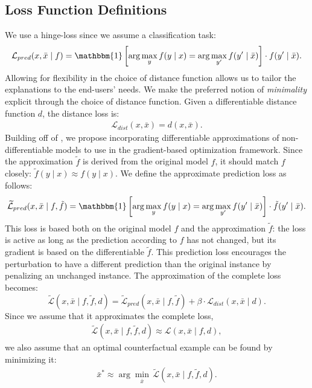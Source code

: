 \subsection{Loss Function Definitions}

We use a hinge-loss since we assume a classification task:
%
\begin{align}
\mathcal{L}_{pred}(x, \bar{x} \mid f) = {\mathbbm{1}}\left[\arg\max_{y} f(y \mid x) = \arg\max_{y'} f(y' \mid \bar{x})\right] \cdot  f(y' \mid \bar{x}).
\end{align}
%
Allowing for flexibility in the choice of distance function allows us to tailor the explanations to the end-users' needs. We make the preferred notion of \emph{minimality} explicit through the choice of distance function. 
Given a differentiable distance function $d$, the distance loss is: 
%
\begin{align}
\mathcal{L}_{dist}(x, \bar{x}) = d(x, \bar{x}). 
\end{align}
%
Building off of \citet{wachter_counterfactual_2017}, we propose incorporating differentiable approximations of non-differentiable models to use in the gradient-based optimization framework. 
Since the approximation $\tilde{f}$ is derived from the original model $f$, it should match $f$ closely: $\tilde{f}(y \mid x) \approx f(y \mid x)$. 
We define the approximate prediction loss as follows:
\begin{align}
\widetilde{\mathcal{L}}_{pred}(x, \bar{x} \mid f, \tilde{f}) = \mathbbm{1}\left[\arg\max_{y} f(y \mid x) = \arg\max_{y'} f(y' \mid \bar{x})\right] \cdot  \tilde{f}(y' \mid \bar{x}).
\end{align}
This loss is based both on the original model $f$ and the approximation $\tilde{f}$:
the loss is active as long as the prediction according to $f$ has not changed, but its gradient is based on the differentiable $\tilde{f}$. 
This prediction loss encourages the perturbation to have a different prediction than the original instance by penalizing an unchanged instance. 
The approximation of the complete loss becomes:
\begin{equation}
\widetilde{\mathcal{L}}(x, \bar{x} \mid f, \tilde{f}, d) =\widetilde{\mathcal{L}}_{pred}(x, \bar{x} \mid f, \tilde{f}) + \beta \cdot \mathcal{L}_{dist}(x, \bar{x} \mid d).
\label{eq:approxloss}
\end{equation}
Since we assume that it approximates the complete loss, 
\begin{align}
\widetilde{\mathcal{L}}(x, \bar{x} \mid f, \tilde{f}, d) \approx \mathcal{L}(x, \bar{x} \mid f, d),
\end{align}
we also assume that an optimal counterfactual example can be found by minimizing it:
%
\begin{align}
\bar{x}^* \approx \arg\min_{\bar{x}} \, \widetilde{\mathcal{L}}(x, \bar{x} \mid f, \tilde{f}, d).
\label{eq:xbar}
\end{align}

